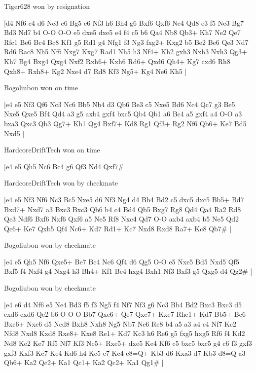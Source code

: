 \showboard

Tiger628 won by resignation

\makegametitle
|d4 Nf6 c4 d6 Nc3 c6 Bg5 e6 Nf3 h6 Bh4 g6 Bxf6 Qxf6 Ne4 Qd8 e3 f5 Nc3 Bg7 Bd3 Nd7 b4 O-O O-O e5 dxe5 dxe5 e4 f4 c5 b6 Qa4 Nb8 Qb3+ Kh7 Ne2 Qe7 Rfc1 Be6 Bc4 Bc8 Kf1 g5 Rd1 g4 Nfg1 f3 Ng3 fxg2+ Kxg2 b5 Be2 Be6 Qe3 Nd7 Rd6 Rac8 Nh5 Nf6 Nxg7 Kxg7 Rad1 Nh5 h3 Nf4+ Kh2 gxh3 Nxh3 Nxh3 Qg3+ Kh7 Bg4 Bxg4 Qxg4 Nxf2 Rxh6+ Kxh6 Rd6+ Qxd6 Qh4+ Kg7 cxd6 Rh8 Qxh8+ Rxh8+ Kg2 Nxe4 d7 Rd8 Kf3 Ng5+ Kg4 Ne6 Kh5  |

\showboard

Bogoliubon won on time

\makegametitle
|e4 e5 Nf3 Qf6 Nc3 Nc6 Bb5 Nb4 d3 Qb6 Be3 c5 Nxe5 Bd6 Nc4 Qc7 g3 Be5 Nxe5 Qxe5 Bf4 Qd4 a3 g5 axb4 gxf4 bxc5 Qb4 Qb1 a6 Bc4 a5 gxf4 a4 O-O a3 bxa3 Qxc3 Qb3 Qg7+ Kh1 Qg4 Bxf7+ Kd8 Rg1 Qf3+ Rg2 Nf6 Qb6+ Ke7 Bd5 Nxd5  |

\showboard

HardcoreDriftTech won on time

\makegametitle
|e4 e5 Qh5 Nc6 Bc4 g6 Qf3 Nd4 Qxf7\#  |

\showboard

HardcoreDriftTech won by checkmate

\makegametitle
|e4 e5 Nf3 Nf6 Nc3 Bc5 Nxe5 d6 Nf3 Ng4 d4 Bb4 Bd2 c5 dxc5 dxc5 Bb5+ Bd7 Bxd7+ Nxd7 a3 Bxc3 Bxc3 Qb6 b4 c4 Bd4 Qb5 Bxg7 Rg8 Qd4 Qa4 Ra2 Rd8 Qc3 Ndf6 Bxf6 Nxf6 Qxf6 a5 Ne5 Rf8 Nxc4 Qd7 O-O axb4 axb4 b5 Ne5 Qd2 Qc6+ Ke7 Qxb5 Qf4 Nc6+ Kd7 Rd1+ Kc7 Nxd8 Rxd8 Ra7+ Kc8 Qb7\#  |

\showboard

Bogoliubon won by checkmate

\makegametitle
|e4 e5 Qh5 Nf6 Qxe5+ Be7 Bc4 Nc6 Qf4 d6 Qg5 O-O e5 Nxe5 Bd5 Nxd5 Qf5 Bxf5 f4 Nxf4 g4 Nxg4 h3 Bh4+ Kf1 Be4 hxg4 Bxh1 Nf3 Bxf3 g5 Qxg5 d4 Qg2\#  |

\showboard

Bogoliubon won by checkmate

\makegametitle
|e4 e6 d4 Nf6 e5 Ne4 Bd3 f5 f3 Ng5 f4 Nf7 Nf3 g6 Nc3 Bb4 Bd2 Bxc3 Bxc3 d5 exd6 cxd6 Qe2 b6 O-O-O Bb7 Qxe6+ Qe7 Qxe7+ Kxe7 Rhe1+ Kd7 Bb5+ Bc6 Bxc6+ Nxc6 d5 Ncd8 Bxh8 Nxh8 Ng5 Nb7 Ne6 Re8 b4 a5 a3 a4 c4 Nf7 Kc2 Nfd8 Nxd8 Kxd8 Rxe8+ Kxe8 Re1+ Kd7 Kc3 h6 Re6 g5 fxg5 hxg5 Rf6 f4 Kd2 Nd8 Ke2 Ke7 Rf5 Nf7 Kf3 Ne5+ Rxe5+ dxe5 Ke4 Kf6 c5 bxc5 bxc5 g4 c6 f3 gxf3 gxf3 Kxf3 Ke7 Ke4 Kd6 h4 Kc5 c7 Kc4 c8=Q+ Kb3 d6 Kxa3 d7 Kb3 d8=Q a3 Qb6+ Ka2 Qc2+ Ka1 Qc1+ Ka2 Qc2+ Ka1 Qg1\#  |

